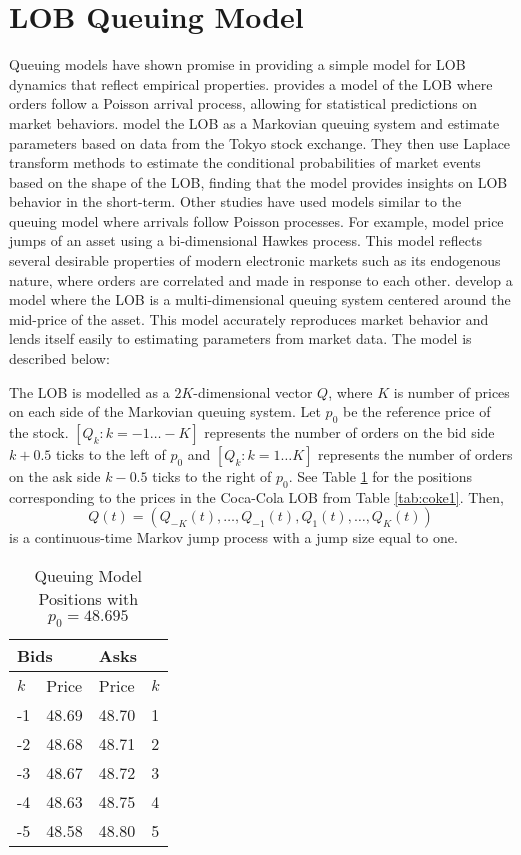 \section{LOB Queuing Model} \label{modelLOB}
Queuing models have shown promise in providing a simple model for LOB dynamics that reflect empirical properties. \cite{A6a} provides a model of the LOB where orders follow a Poisson arrival process, allowing for statistical predictions on market behaviors. \cite{A6b} model the LOB as a Markovian queuing system and estimate parameters based on data from the Tokyo stock exchange. They then use Laplace transform methods to estimate the conditional probabilities of market events based on the shape of the LOB, finding that the model provides insights on LOB behavior in the short-term. Other studies have used models similar to the queuing model where arrivals follow Poisson processes. For example, \cite{A9} model price jumps of an asset using a bi-dimensional Hawkes process. This model reflects several desirable properties of modern electronic markets such as its endogenous nature, where orders are correlated and made in response to each other. \cite{A6} develop a model where the LOB is a multi-dimensional queuing system centered around the mid-price of the asset. This model accurately reproduces market behavior and lends itself easily to estimating parameters from market data. The model is described below:

The LOB is modelled as a $2K$-dimensional vector $Q$, where $K$ is number of prices on each side of the Markovian queuing system. Let $p_0$ be the reference price of the stock. $[Q_k: k = -1 \ldots -K]$ represents the number of orders on the bid side $k + 0.5$ ticks to the left of $p_0$ and $[Q_k: k =1 \ldots K]$ represents the number of orders on the ask side $k - 0.5$ ticks to the right of $p_0$. See Table \ref{tab:queue_positions} for the positions corresponding to the prices in the Coca-Cola LOB from Table \ref{tab:coke1}. Then, $$Q(t) = (Q_{-K}(t), \ldots, Q_{-1}(t), Q_1(t), \ldots , Q_K(t))$$ is a continuous-time Markov jump process with a jump size equal to one.

\begin{table}[htbp]
\caption{Queuing Model Positions with $p_0 = 48.695$} \label{tab:queue_positions}
\begin{center}
\begin{tabular}{ll|ll}
\hline \hline
\multicolumn{2}{l|}{\textbf{Bids}} & \multicolumn{2}{l}{\textbf{Asks}} \\
\hline
$k$          & Price          & Price           & $k$          \\
\hline
-1             & 48.69          & 48.70           & 1             \\
-2             & 48.68          & 48.71           & 2            \\
-3             & 48.67          & 48.72           & 3            \\
-4             & 48.63          & 48.75           & 4            \\
-5             & 48.58          & 48.80           & 5          
\end{tabular}
\end{center}
\end{table}

